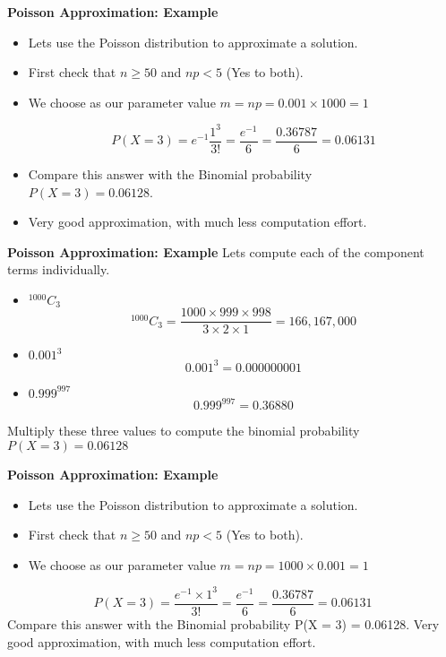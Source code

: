 \documentclass[a4paper,12pt]{article}
\begin{document}
{
\textbf{Poisson Approximation: Example}
\begin{itemize}
\item Lets use the Poisson distribution to approximate a solution.

\item First check that $n \geq 50$ and $np <5$ (Yes to both).

\item We choose as our parameter value $m = np = 0.001 \times 1000  = 1$

\[P(X=3) = e^{-1}\frac{1^3}{3!} = \frac{e^{-1}}{6} = \frac{0.36787}{6} =  0.06131\]
\item Compare this answer with the Binomial probability \\ $P(X=3) = 0.06128$.
\item Very good approximation, with much less computation effort.
\end{itemize}
}



\textbf{Poisson Approximation: Example}
Lets compute each of the component terms individually.

\begin{itemize}
\item $^{1000}C_{3}$
\[^{1000}C_{3} = \frac{1000 \times 999 \times 998}{3 \times 2 \times 1} = 166,167,000\]
\item $0.001^3$
\[0.001^3 = 0.000000001\]
\item $0.999^{997}$
\[0.999^{997} = 0.36880\]
\end{itemize}


Multiply these three values to compute the binomial probability
$P(X = 3) = 0.06128$
\medskip


\textbf{Poisson Approximation: Example}
\begin{itemize}
\item Lets use the Poisson distribution to approximate a solution.
\item First check that $n \geq 50$ and $np < 5$ (Yes to both).
\item We choose as our parameter value $m = np = 1000 \times 0.001 = 1$
\end{itemize}
\[P(X = 3) = \frac{e^{-1} \times 1^3}{3!} = \frac{e^{-1}}{6} = \frac{0.36787}{6} = 0.06131 \]
Compare this answer with the Binomial probability
P(X = 3) = 0.06128.
Very good approximation, with much less computation effort.
\medskip
\end{document}
